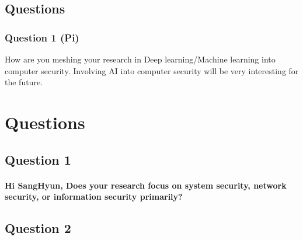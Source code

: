 \subsection{Questions}

\subsubsection{Question 1 (Pi)}
How are you meshing your research in Deep learning/Machine learning into computer security. Involving AI into computer security will be very interesting for the future.







\appendix



\section{Questions}
\subsection{Question 1}
\paragraph{Hi SangHyun, Does your research focus on system security, network security, or information security primarily?}
\subsection{Question 2}
\paragraph{}


\endinput
